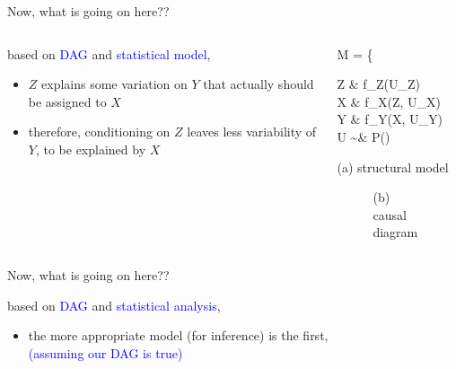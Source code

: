 \begin{frame}
	{Now, what is going on here??}
	\begin{columns}
		\begin{column}{0.5\textwidth}
			based on \textcolor{blue}{DAG} and \textcolor{blue}{statistical model},
			\begin{itemize}
				\item $Z$ explains some variation on $Y$ that actually should be assigned to $X$
				\item therefore, conditioning on $Z$ leaves less variability of $Y$, to be explained by $X$
			\end{itemize}
		\end{column}
		\begin{column}{0.5\textwidth}  
			\begin{equ}
				M = \left\{ \begin{aligned} 
					Z \leftarrow & \; f_{Z}(U_{Z}) \\
					X \leftarrow & \; f_{X}(Z, U_{X}) \\
					Y \leftarrow & \; f_{Y}(X, U_{Y}) \\
					U \sim & \; P()
				\end{aligned} \right
				\caption*{(a) structural model}
			\end{equ}
			\begin{figure}
				\caption*{(b) causal diagram}
			\end{figure}
		\end{column}
	\end{columns}
\end{frame}
%
%
\begin{lhframe}[rhgraphic={\texttt{[image: pipe1\_reg1.png]}}]
	{Now, what is going on here??}
	
	based on \textcolor{blue}{DAG} and \textcolor{blue}{statistical analysis},
	\begin{itemize}
		\item the more appropriate model (for inference) is the first, \\
		{\small \textcolor{blue}{(assuming our DAG is true)} }
	\end{itemize}
\end{lhframe}
%
%
